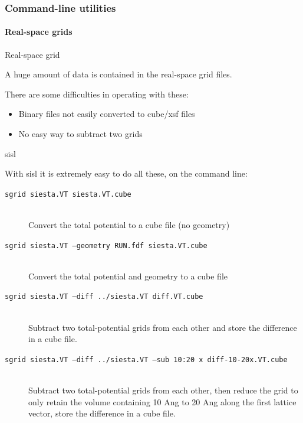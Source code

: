 \begin{frame}[fragile]
  \frametitle{Command-line utilities}
  \framesubtitle{Real-space grids}

  \begin{block}{Real-space grid}

    A huge amount of data is contained in the real-space grid files.

    There are some difficulties in operating with these:
    \begin{itemize}
      \item Binary files not easily converted to cube/xsf files
      \item No easy way to subtract two grids
    \end{itemize}

  \end{block}

  \begin{block}{sisl}

    With sisl it is extremely easy to do all these, on the command line:

    \begin{description}
      \item[\texttt{sgrid siesta.VT siesta.VT.cube}]\mbox{}\\

      Convert the total potential to a cube file (no geometry)

      \item[\texttt{sgrid siesta.VT --geometry RUN.fdf siesta.VT.cube}]\mbox{}\\

      Convert the total potential and geometry to a cube file

      \item[\texttt{sgrid siesta.VT --diff ../siesta.VT diff.VT.cube}]\mbox{}\\

      Subtract two total-potential grids from each other and store the difference in a
      cube file.

      \item[\texttt{sgrid siesta.VT --diff ../siesta.VT --sub 10:20 x diff-10-20x.VT.cube}]\mbox{}\\

      Subtract two total-potential grids from each other, then reduce the grid to only
      retain the volume containing 10 Ang to 20 Ang along the first lattice vector, store the difference in a
      cube file.

    \end{description}

  \end{block}

\end{frame}


